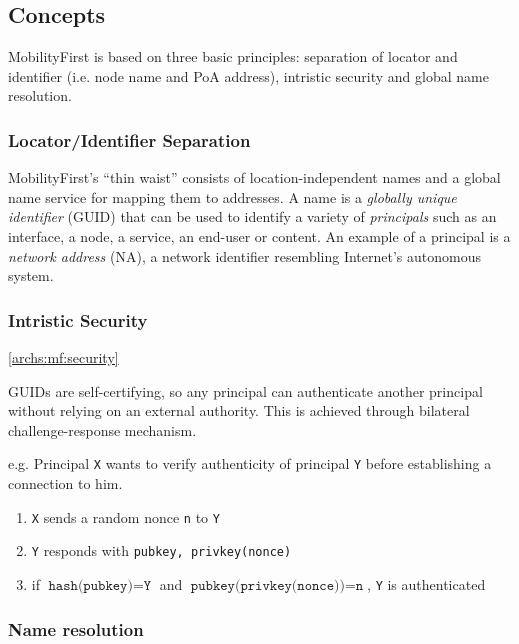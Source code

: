         \subsection{Concepts}

            MobilityFirst is based on three basic principles: separation of locator and identifier (i.e. node name and PoA address), intristic security and global name resolution.

            \subsubsection{Locator/Identifier Separation}

                MobilityFirst's ``thin waist'' consists of location-independent names and a global name service for mapping them to addresses. A name is a \emph{globally unique identifier} (GUID) that can be used to identify a variety of \emph{principals} such as an interface, a node, a service, an end-user or content. An example of a principal is a \emph{network address} (NA), a network identifier resembling Internet's autonomous system.

            \subsubsection{Intristic Security}\ref{archs:mf:security}

                GUIDs are self-certifying, so any principal can authenticate another principal without relying on an external authority. This is achieved through bilateral challenge-response mechanism.

                e.g. Principal \texttt{X} wants to verify authenticity of principal \texttt{Y} before establishing a connection to him.
                \begin{enumerate}
                    \item \texttt{X} sends a random nonce \texttt{n} to \texttt{Y}
                    \item \texttt{Y} responds with \texttt{{pubkey, privkey(nonce)}}
                    \item if $\texttt{hash(pubkey)} = \texttt{Y}$ and $\texttt{pubkey(privkey(nonce))} = \texttt{n}$, \texttt{Y} is authenticated
                \end{enumerate}

            \subsubsection{Name resolution}

